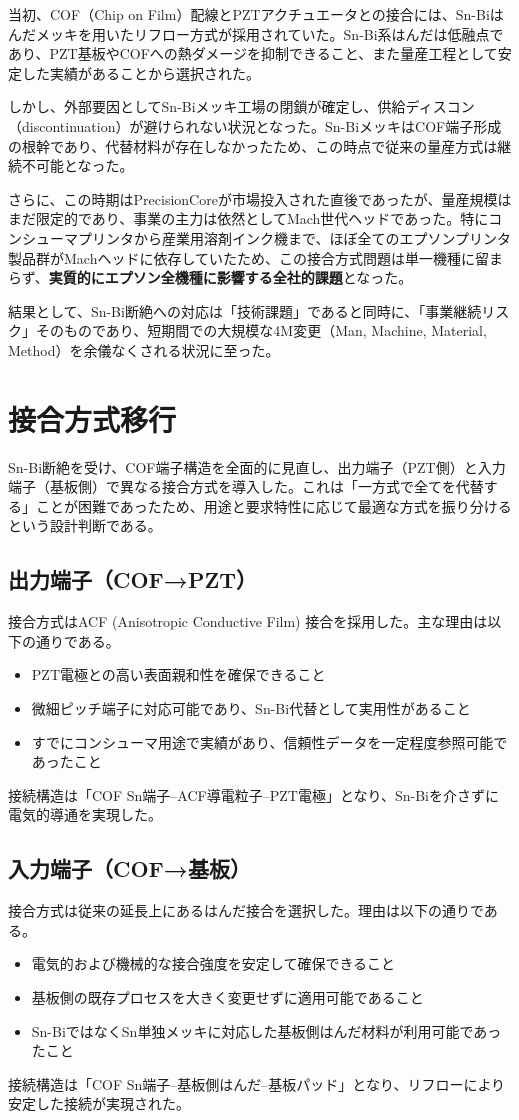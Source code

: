 \documentclass[conference]{IEEEtran}
\begin{document}
当初、COF（Chip on Film）配線とPZTアクチュエータとの接合には、Sn-Biはんだメッキを用いたリフロー方式が採用されていた。Sn-Bi系はんだは低融点であり、PZT基板やCOFへの熱ダメージを抑制できること、また量産工程として安定した実績があることから選択された。  

しかし、外部要因としてSn-Biメッキ工場の閉鎖が確定し、供給ディスコン（discontinuation）が避けられない状況となった。Sn-BiメッキはCOF端子形成の根幹であり、代替材料が存在しなかったため、この時点で従来の量産方式は継続不可能となった。  

さらに、この時期はPrecisionCoreが市場投入された直後であったが、量産規模はまだ限定的であり、事業の主力は依然としてMach世代ヘッドであった。特にコンシューマプリンタから産業用溶剤インク機まで、ほぼ全てのエプソンプリンタ製品群がMachヘッドに依存していたため、この接合方式問題は単一機種に留まらず、\textbf{実質的にエプソン全機種に影響する全社的課題}となった。  

結果として、Sn-Bi断絶への対応は「技術課題」であると同時に、「事業継続リスク」そのものであり、短期間での大規模な4M変更（Man, Machine, Material, Method）を余儀なくされる状況に至った。

\section{接合方式移行}
Sn-Bi断絶を受け、COF端子構造を全面的に見直し、出力端子（PZT側）と入力端子（基板側）で異なる接合方式を導入した。これは「一方式で全てを代替する」ことが困難であったため、用途と要求特性に応じて最適な方式を振り分けるという設計判断である。

\subsection{出力端子（COF→PZT）}
接合方式はACF (Anisotropic Conductive Film) 接合を採用した。主な理由は以下の通りである。  
\begin{itemize}
  \item PZT電極との高い表面親和性を確保できること  
  \item 微細ピッチ端子に対応可能であり、Sn-Bi代替として実用性があること  
  \item すでにコンシューマ用途で実績があり、信頼性データを一定程度参照可能であったこと  
\end{itemize}
接続構造は「COF Sn端子–ACF導電粒子–PZT電極」となり、Sn-Biを介さずに電気的導通を実現した。

\subsection{入力端子（COF→基板）}
接合方式は従来の延長上にあるはんだ接合を選択した。理由は以下の通りである。  
\begin{itemize}
  \item 電気的および機械的な接合強度を安定して確保できること  
  \item 基板側の既存プロセスを大きく変更せずに適用可能であること  
  \item Sn-BiではなくSn単独メッキに対応した基板側はんだ材料が利用可能であったこと  
\end{itemize}
接続構造は「COF Sn端子–基板側はんだ–基板パッド」となり、リフローにより安定した接続が実現された。
\end{document}
